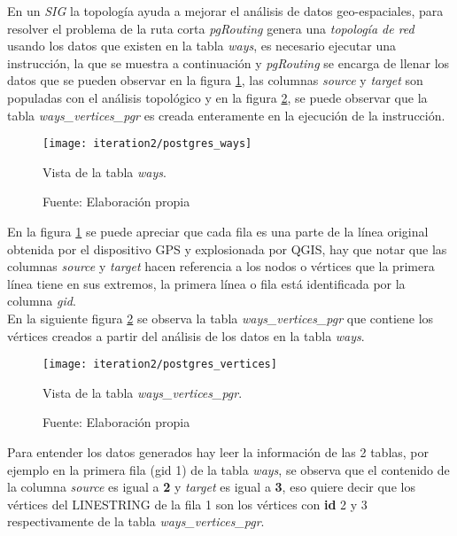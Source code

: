 En un \emph{SIG} la topología ayuda a mejorar el análisis de datos geo-espaciales, para resolver el problema de la ruta corta \emph{pgRouting} genera una \emph{topología de red} usando los datos que existen en la tabla \emph{ways}, es necesario ejecutar una instrucción, la que se muestra a continuación y \emph{pgRouting} se encarga de llenar los datos que se pueden observar en la figura \ref{fig:postgres_ways}, las columnas \emph{source} y \emph{target} son populadas con el análisis topológico y en la figura \ref{fig:postgres_vertices}, se puede observar que la tabla \emph{ways\_vertices\_pgr} es creada enteramente en la ejecución de la instrucción.\\

\begin{figure}[H]
 \begin{center}
   \texttt{[image: iteration2/postgres\_ways]}
   \caption{Vista de la tabla \emph{ways}.}
   \label{fig:postgres_ways}
   \caption*{Fuente: Elaboración propia}
 \end{center}
\end{figure}

En la figura \ref{fig:postgres_ways} se puede apreciar que cada fila es una parte de la línea original obtenida por el dispositivo GPS y explosionada por QGIS, hay que notar que las columnas \emph{source} y \emph{target} hacen referencia a los nodos o vértices que la primera línea tiene en sus extremos, la primera línea o fila está identificada por la columna \emph{gid}.\\

En la siguiente figura \ref{fig:postgres_vertices} se observa la tabla \emph{ways\_vertices\_pgr} que contiene los vértices creados a partir del análisis de los datos en la tabla \emph{ways}.

\begin{figure}[H]
 \begin{center}
   \texttt{[image: iteration2/postgres\_vertices]}
   \caption{Vista de la tabla \emph{ways\_vertices\_pgr}.}
   \label{fig:postgres_vertices}
   \caption*{Fuente: Elaboración propia}
 \end{center}
\end{figure}

Para entender los datos generados hay leer la información de las 2 tablas, por ejemplo en la primera  fila (gid 1) de la tabla \emph{ways}, se observa que el contenido de la columna \emph{source} es igual a \textbf{2} y \emph{target} es igual a \textbf{3}, eso quiere decir que los vértices del LINESTRING de la fila 1 son los vértices con \textbf{id} 2 y 3 respectivamente de la tabla \emph{ways\_vertices\_pgr}.\\

